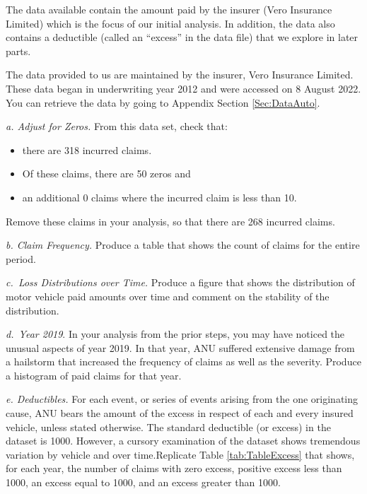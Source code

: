 \documentclass[
]{book}
\providecommand{\tightlist}{%
  \setlength{\itemsep}{0pt}\setlength{\parskip}{0pt}}
\begin{document}
The data available contain the amount paid by the insurer (Vero Insurance Limited) which is the focus of our initial analysis. In addition, the data also contains a deductible (called an ``excess'' in the data file) that we explore in later parts.

The data provided to us are maintained by the insurer, Vero Insurance Limited. These data began in underwriting year 2012 and were accessed on 8 August 2022. You can retrieve the data by going to Appendix Section \ref{Sec:DataAuto}.

\emph{a. Adjust for Zeros.} From this data set, check that:

\begin{itemize}
\tightlist
\item
  there are 318 incurred claims.
\item
  Of these claims, there are 50 zeros and
\item
  an additional 0 claims where the incurred claim is less than 10.
\end{itemize}

Remove these claims in your analysis, so that there are 268 incurred claims.

\emph{b. Claim Frequency.} Produce a table that shows the count of claims for the entire period.

\emph{c.~Loss Distributions over Time.} Produce a figure that shows the distribution of motor vehicle paid amounts over time and comment on the stability of the distribution.

\emph{d.~Year 2019}. In your analysis from the prior steps, you may have noticed the unusual aspects of year 2019. In that year, ANU suffered extensive damage from a hailstorm that increased the frequency of claims as well as the severity. Produce a histogram of paid claims for that year.

\emph{e. Deductibles.} For each event, or series of events arising from the one originating cause, ANU bears the amount of the excess in respect of each and every insured vehicle, unless stated otherwise. The standard deductible (or excess) in the dataset is 1000. However, a cursory examination of the dataset shows tremendous variation by vehicle and over time.Replicate Table \ref{tab:TableExcess} that shows, for each year, the number of claims with zero excess, positive excess less than 1000, an excess equal to 1000, and an excess greater than 1000.
\end{document}
